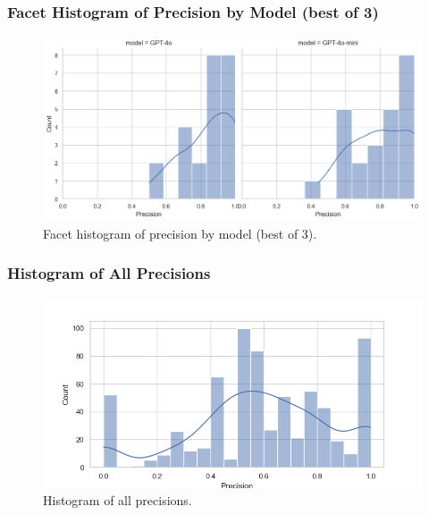             \subsubsection{Facet Histogram of Precision by Model (best of 3)}
            \begin{figure}[H]
                \centering
                \includegraphics[scale=0.75]{images_exp2/precision/facet_hist_precision_by_model_best_precision.png}
                \caption{Facet histogram of precision by model (best of 3).}
                \label{fig:facet_hist_precision_by_model_best_precision}
            \end{figure}


            \subsubsection{Histogram of All Precisions}
            \begin{figure}[H]
                \centering
                \includegraphics[scale=0.75]{images_exp2/precision/hist_precision_all.png}
                \caption{Histogram of all precisions.}
                \label{fig:hist_precision_all}
            \end{figure}

